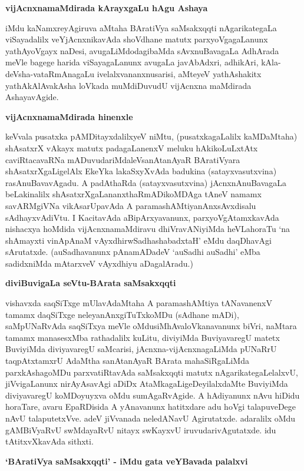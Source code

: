 {\medskip
\noindent
{\large\bf vijAcnxnamaMdirada kArayxgaLu hAgu Ashaya}}\label{page22}
\medskip

\noindent
iMdu kaNamxreyAgiruva aMtaha BAratiVya saMsakxqqti nAgarikategaLa viSayadalilx veYjAcnxnika\-vAda shoVdhane matutx parxyoVgagaLanunx yathAyoVgayx naDesi, avugaLiM\-dodagi\-baMda sAvxnuBavagaLa AdhArada meVle bagege harida viSayagaLanunx avugaLa javAbAdxri, adhikAri, kAla-deVsha-vataRmAnagaLu ivelalx\-vananxnu\-sarisi, aMteyeV yathAshakitx yathAkAlAvakAsha loVkada muMdiDuvudU vijAcnxna maMdirada Ashaya\-vAgide.

{\medskip
\noindent
{\large\bf vijAcnxnamaMdirada hinenxle}}
\medskip

\noindent
keVvala pusatxka pAMDitayxdalilxyeV niMtu, (pusatxkagaLalilx kaMDaMtaha) shAsatxrX vAkayx matutx padagaLanenxV meluku hAkikoLuLxtAtx caviRtacavaRNa mADuvudariMdaleV\break sanAtanAyaR BAratiVyara shAsatxrXgaLi\-gelAlx EkeYka lakaSxyXvAda badukina (satayx\-vasutxvina) rasAnuBavavAgadu. A padAthaRda (satayxvasutxvina) jAcnxnAnu\-BavagaLa beLakinalilx shAsatxrXgaLananxthaRmADikoMDAga tAneV namamx 
savARMgiVNa vikAsarUpavAda A parama\-shAMti\-yanAnxsAvxdisalu sAdhayxvAdiVtu. I KacitavAda aBipArxyavanunx, parxyoVgAtamxkavAda nishacxya hoMdida\- vijAcnxnamaMdiravu dhiVravANiyiMda heVLahoraTu `na shAmayxti vinApAnaM vAyxdhirwSadha\-shabadxtaH'\label{25} eMdu daqDhavAgi sArutatxde. (auSadhavanunx pAnamADadeV `auSadhi auSadhi' eMba sadidxniMda mAtarx\-veV vAyxdhiyu aDagalAradu.)

{\bigskip
\noindent
{\large\bf diviBuvigaLa seVtu-BArata saMsakxqqti}}\label{page23}
\medskip

\noindent
vishavxda saqSiTxge mUlavAdaMtaha A paramashAMtiya tANavanenxV tamamx daqSiTxge nele\-yanAnxgiTuTxkoMDu (sAdhane mADi), saMpUNaRvAda saqSiTxya meVle oMdu\break siMhAvaloVkanavanunx biVri, naMtara tamamx manasesxMba rathadalilx kuLitu, diviyiMda BuviyavaregU matetx BuviyiMda diviyavaregU saMcarisi, jAcnxna-vijAcnxna\-gaLiMda pUNaRrU taqpAtxtamxrU AdaMtha sanAtanAyaR BArata mahaSiRgaLiMda parxkAsha\-goMDu parxvatiRtavAda saMsakxqqti matutx nAgarikategaLelalxvU, jiVvigaLanunx nirAyAsavAgi aDiDx AtaMkagaLi\-geDeyilalxdaMte BuviyiMda diviyavaregU koMDoyuyxva oMdu sumAgaRvAgide. A hAdiyanunx nAvu hiDidu horaTare, avaru EpaRDisida A yAnavanunx hatitxdare adu hoVgi talapuveDege nAvU talaputetxVve. adeV jiVvanada neledANavU Agirutatxde. adaralilx oMdu gAMBiVyaRvU swMdayaRvU nitayx swKayxvU iruvudarivAgutatxde. idu tAtitxvXkavAda sithxti.

{\bigskip
\noindent
{\large\bf `BAratiVya saMsakxqqti' - iMdu gata veYBavada palalxvi}}\label{page23}
\medskip


